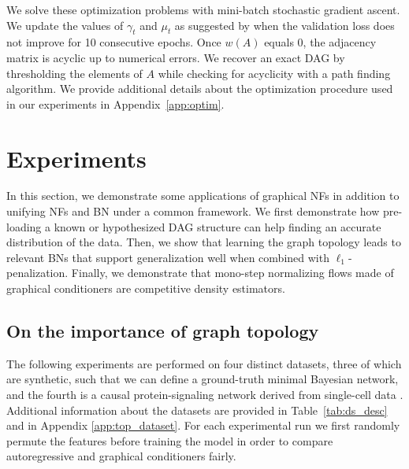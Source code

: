 \documentclass[twoside]{article}
\newcommand{\Cref}[1]{Table~\ref{#1}}
\begin{document}
 We solve these optimization problems with mini-batch stochastic gradient ascent. We update the values of $\gamma_t$ and $\mu_t$ as suggested by \cite{DAG-2} when the validation loss does not improve for 10 consecutive epochs. Once $w(A)$ equals $0$, the adjacency matrix is acyclic up to numerical errors. We recover an exact DAG by thresholding the elements of $A$ while checking for acyclicity with a path finding algorithm.
We provide additional details about the optimization procedure used in our experiments in Appendix~\ref{app:optim}.


\section{Experiments}
In this section, we demonstrate some applications of graphical NFs in addition to unifying NFs and BN under a common framework. We first demonstrate how pre-loading a known or hypothesized DAG structure can help finding an accurate distribution of the data. Then, we show that learning the graph topology leads to relevant BNs that support generalization well when combined with $\ell_1$-penalization. Finally, we demonstrate that mono-step normalizing flows made of graphical conditioners are competitive density estimators.
\subsection{On the importance of graph topology}
The following experiments are performed on four distinct datasets, three of which are synthetic, such that we can define a ground-truth minimal Bayesian network, and the fourth is a causal protein-signaling network derived from single-cell data \citep{proteins}. Additional information about the datasets are provided in \Cref{tab:ds_desc} and in Appendix \ref{app:top_dataset}. For each experimental run we first randomly permute the features before training the model in order to compare autoregressive and graphical conditioners fairly.
\end{document}
